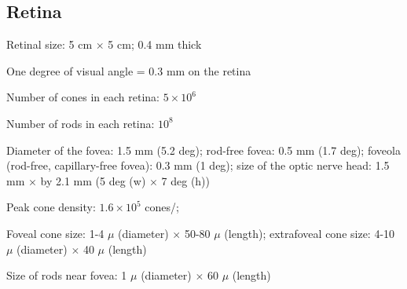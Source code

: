 \ee

\subsection*{Retina}

\be

\item Retinal size: 5 cm $\times$ 5 cm; 0.4 mm thick

\item One degree of visual angle = 0.3 mm on the retina

\item Number of cones in each retina: $5 \times 10^6$

\item Number of rods in each retina: $10^8$

\item Diameter of the fovea: 1.5 mm (5.2 deg); rod-free fovea: 0.5 mm
(1.7 deg); foveola (rod-free, capillary-free fovea): 0.3 mm (1 deg);
size of the optic nerve head: 1.5 mm $\times$ by 2.1 mm (5 deg (w)
$\times$ 7 deg (h))
 
\item Peak cone density:  $1.6 \times 10^5$ cones/\squaremm;

\item Foveal cone size: 1-4 $\mu$ (diameter) $\times$ 50-80 $\mu$ (length);
extrafoveal cone size: 4-10 $\mu$ (diameter) $\times$ 40 $\mu$ (length)

\item Size of rods near fovea: 1 $\mu$ (diameter) $\times$ 60 $\mu$ (length)

